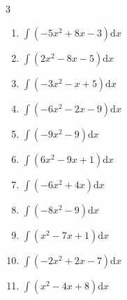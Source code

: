\begin{multicols}{3}
\begin{enumerate}
  \item $\displaystyle \int \left( -5x^{2}+8x-3 \right) \mathrm{d}x$


\columnbreak %

  \item $\displaystyle \int \left( 2x^{2}-8x-5 \right) \mathrm{d}x$


  \item $\displaystyle \int \left( -3x^{2}-x+5 \right) \mathrm{d}x$


  \item $\displaystyle \int \left( -6x^{2}-2x-9 \right) \mathrm{d}x$


  \item $\displaystyle \int \left( -9x^{2}-9 \right) \mathrm{d}x$


  \item $\displaystyle \int \left( 6x^{2}-9x+1 \right) \mathrm{d}x$


  \item $\displaystyle \int \left( -6x^{2}+4x \right) \mathrm{d}x$


  \item $\displaystyle \int \left( -8x^{2}-9 \right) \mathrm{d}x$


  \item $\displaystyle \int \left( x^{2}-7x+1 \right) \mathrm{d}x$


  \item $\displaystyle \int \left( -2x^{2}+2x-7 \right) \mathrm{d}x$


  \item $\displaystyle \int \left( x^{2}-4x+8 \right) \mathrm{d}x$


\end{enumerate}
\end{multicols}
